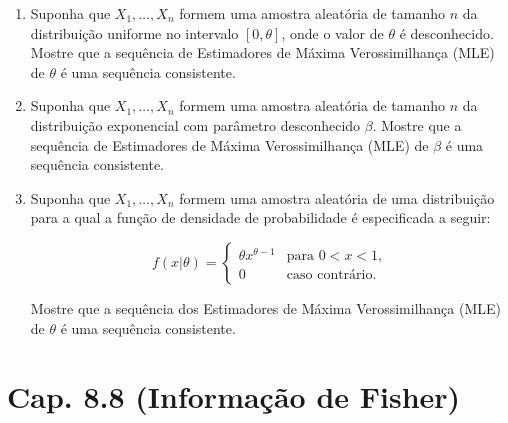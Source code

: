 \documentclass[leqno, 12pt]{article}
\theoremstyle{definition}
\begin{document}
\begin{enumerate}
\item \textbf{\parencite[ex. 11, pág. 441]{DeGroot:2014}} Suponha que $X_1, \ldots, X_n$ formem uma amostra aleatória de tamanho $n$ da distribuição uniforme no intervalo $[0, \theta]$, onde o valor de $\theta$ é desconhecido. Mostre que a sequência de Estimadores de Máxima Verossimilhança (MLE) de $\theta$ é uma sequência consistente.


\item \textbf{\parencite[ex. 12, pág. 441]{DeGroot:2014}} Suponha que $X_1, \ldots, X_n$ formem uma amostra aleatória de tamanho $n$ da distribuição exponencial com parâmetro desconhecido $\beta$. Mostre que a sequência de Estimadores de Máxima Verossimilhança (MLE) de $\beta$ é uma sequência consistente.


\item \textbf{\parencite[ex. 13, pág. 442]{DeGroot:2014}} Suponha que $X_1, \ldots, X_n$ formem uma amostra aleatória de uma distribuição para a qual a função de densidade de probabilidade é especificada a seguir:

\[ f(x|\theta) = \begin{cases}
\theta x^{\theta-1} & \text{para } 0 < x < 1, \\
0 & \text{caso contrário}.
\end{cases} \]

Mostre que a sequência dos Estimadores de Máxima Verossimilhança (MLE) de $\theta$ é uma sequência consistente.

\end{enumerate}

\section*{Cap. 8.8 (Informação de Fisher)}
\end{document}
